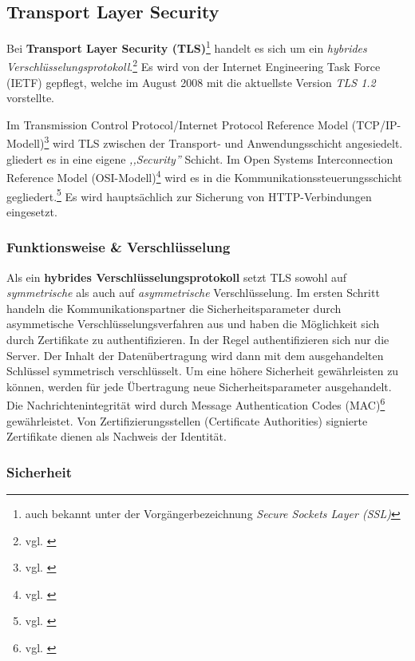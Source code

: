 \documentclass[12pt,a4paper,pointednumbers,abstracton]{scrartcl}
\begin{document}
\subsection{Transport Layer Security}

Bei \textbf{Transport Layer Security (TLS)}\footnote{auch bekannt unter der Vorgängerbezeichnung \emph{Secure Sockets Layer (SSL)}} handelt es sich um ein \emph{hybrides Verschlüsselungsprotokoll}.\footnote{vgl. \cite[Hannes Federrath, Andreas Pfitzmann: ,,IT-Sicherheit''. Kapitel 2.4 (S. 279-281)]{WK06}}
Es wird von der Internet Engineering Task Force (IETF) gepflegt, welche im August 2008 mit \cite{RFC5246} die aktuellste Version \emph{TLS 1.2} vorstellte.

Im Transmission Control Protocol/Internet Protocol Reference Model (TCP/IP-Modell)\footnote{vgl. \cite[Section 1.4.2]{TW10}} wird TLS zwischen der Transport- und Anwendungsschicht angesiedelt.
\cite[Section 8.9.3]{TW10} gliedert es in eine eigene \emph{,,Security''} Schicht.
Im Open Systems Interconnection Reference Model (OSI-Modell)\footnote{vgl. \cite[Section 1.4.1]{TW10}} wird es in die Kommunikationssteuerungsschicht gegliedert.\footnote{vgl. \cite[Section 12.4]{Sin12}}
Es wird hauptsächlich zur Sicherung von HTTP-Verbindungen eingesetzt.

\subsubsection{Funktionsweise \& Verschlüsselung}

Als ein \textbf{hybrides Verschlüsselungsprotokoll} setzt TLS sowohl auf \emph{symmetrische} als auch auf \emph{asymmetrische} Verschlüsselung.
Im ersten Schritt handeln die Kommunikationspartner die Sicherheitsparameter durch asymmetische Verschlüsselungsverfahren aus und haben die Möglichkeit sich durch Zertifikate zu authentifizieren.
In der Regel authentifizieren sich nur die Server.
Der Inhalt der Datenübertragung wird dann mit dem ausgehandelten Schlüssel symmetrisch verschlüsselt.
Um eine höhere Sicherheit gewährleisten zu können, werden für jede Übertragung neue Sicherheitsparameter ausgehandelt.
Die Nachrichtenintegrität wird durch Message Authentication Codes (MAC)\footnote{vgl. \cite[Section 8.6.1]{TW10}} gewährleistet.
Von Zertifizierungsstellen (Certificate Authorities) signierte Zertifikate dienen als Nachweis der Identität.

\subsubsection{Sicherheit}
\label{sec:basics-security}
\end{document}
